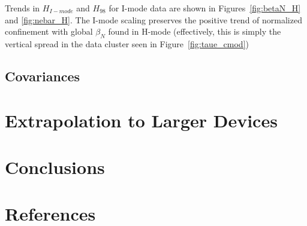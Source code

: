 \documentclass[12pt]{iopart}
\begin{document}
\noindent Trends in $H_{I-mode}$ and $H_{98}$ for I-mode data are shown in Figures~\ref{fig:betaN_H} and \ref{fig:nebar_H}.
The I-mode scaling preserves the positive trend of normalized confinement with global $\beta_N$ found in H-mode (effectively, this is simply the vertical spread in the data cluster seen in Figure~\ref{fig:taue_cmod})

\subsection{Covariances}\label{subsec:covar}

\section{Extrapolation to Larger Devices}\label{sec:extrap}

\section{Conclusions}\label{sec:conclusion}

\section*{References}


\end{document}
